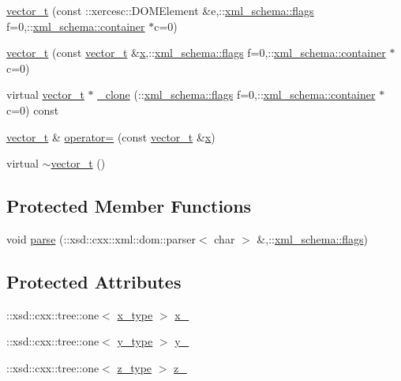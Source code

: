 \begin{DoxyCompactItemize}
\hyperlink{classvector__t_a3ecb720954ae8b8b5e4a6c39bcc57618}{vector\+\_\+t} (const \+::xercesc\+::\+D\+O\+M\+Element \&e,\+::\hyperlink{namespacexml__schema_a0612287d030cb2732d31a45b258fdc87}{xml\+\_\+schema\+::flags} f=0,\+::\hyperlink{namespacexml__schema_ada9aa30dc722e93ee2ed7243085402a5}{xml\+\_\+schema\+::container} $\ast$c=0)
\item 
\hyperlink{classvector__t_a5bb219af224d0e0c8519a7d6028f8ab3}{vector\+\_\+t} (const \hyperlink{classvector__t}{vector\+\_\+t} \&\hyperlink{classvector__t_a2b3fbe3ac4e41a57bcd63384ac1cc45e}{x},\+::\hyperlink{namespacexml__schema_a0612287d030cb2732d31a45b258fdc87}{xml\+\_\+schema\+::flags} f=0,\+::\hyperlink{namespacexml__schema_ada9aa30dc722e93ee2ed7243085402a5}{xml\+\_\+schema\+::container} $\ast$c=0)
\item 
virtual \hyperlink{classvector__t}{vector\+\_\+t} $\ast$ \hyperlink{classvector__t_af377028533949e4849e342ede7cdab89}{\+\_\+clone} (\+::\hyperlink{namespacexml__schema_a0612287d030cb2732d31a45b258fdc87}{xml\+\_\+schema\+::flags} f=0,\+::\hyperlink{namespacexml__schema_ada9aa30dc722e93ee2ed7243085402a5}{xml\+\_\+schema\+::container} $\ast$c=0) const 
\item 
\hyperlink{classvector__t}{vector\+\_\+t} \& \hyperlink{classvector__t_ac7b3b90f82005375a5b348c086f42c72}{operator=} (const \hyperlink{classvector__t}{vector\+\_\+t} \&\hyperlink{classvector__t_a2b3fbe3ac4e41a57bcd63384ac1cc45e}{x})
\item 
virtual \hyperlink{classvector__t_a34b97db855d4c7d3eae880334900c49d}{$\sim$vector\+\_\+t} ()
\end{DoxyCompactItemize}
\subsection*{Protected Member Functions}
\begin{DoxyCompactItemize}
\item 
void \hyperlink{classvector__t_a003f2489abfa6c41c8a00423a1e021b7}{parse} (\+::xsd\+::cxx\+::xml\+::dom\+::parser$<$ char $>$ \&,\+::\hyperlink{namespacexml__schema_a0612287d030cb2732d31a45b258fdc87}{xml\+\_\+schema\+::flags})
\end{DoxyCompactItemize}
\subsection*{Protected Attributes}
\begin{DoxyCompactItemize}
\item 
\+::xsd\+::cxx\+::tree\+::one$<$ \hyperlink{classvector__t_a3e09c311dbbdc507b68a2f3fa0c3d25b}{x\+\_\+type} $>$ \hyperlink{classvector__t_a1769255617bd2fa4eacf02eacc65bc0e}{x\+\_\+}
\item 
\+::xsd\+::cxx\+::tree\+::one$<$ \hyperlink{classvector__t_ab24cc76c51c8a32d39f97d1b4f8ddc5c}{y\+\_\+type} $>$ \hyperlink{classvector__t_a973f8fd664c354e97518ca735124b7a2}{y\+\_\+}
\item 
\+::xsd\+::cxx\+::tree\+::one$<$ \hyperlink{classvector__t_a99f7b43996ec66480576ae8bd8d03cb6}{z\+\_\+type} $>$ \hyperlink{classvector__t_ac5887bca2fcd6cccde2e3cfdd3477108}{z\+\_\+}
\end{DoxyCompactItemize}


